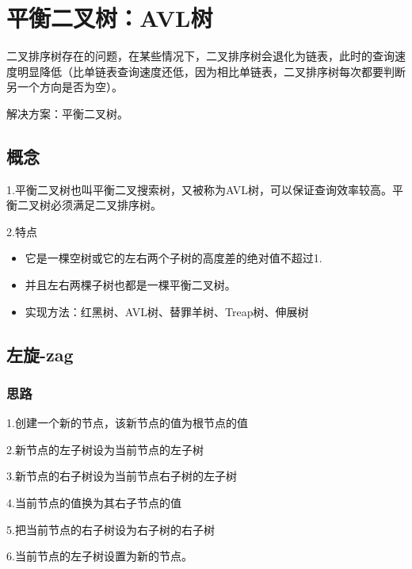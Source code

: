 \documentclass[a4paper]{report}
\begin{document}
\chapter{平衡二叉树：AVL树}
二叉排序树存在的问题，在某些情况下，二叉排序树会退化为链表，此时的查询速度明显降低（比单链表查询速度还低，因为相比单链表，二叉排序树每次都要判断另一个方向是否为空）。

解决方案：平衡二叉树。
\section{概念}
1.平衡二叉树也叫平衡二叉搜索树，又被称为AVL树，可以保证查询效率较高。平衡二叉树必须满足二叉排序树。

2.特点
\begin{itemize}
  \item 它是一棵空树或它的左右两个子树的高度差的绝对值不超过1.
  \item 并且左右两棵子树也都是一棵平衡二叉树。
  \item 实现方法：红黑树、AVL树、替罪羊树、Treap树、伸展树
\end{itemize}
\section{左旋-zag}
\subsection{思路}
1.创建一个新的节点，该新节点的值为根节点的值

2.新节点的左子树设为当前节点的左子树

3.新节点的右子树设为当前节点右子树的左子树

4.当前节点的值换为其右子节点的值

5.把当前节点的右子树设为右子树的右子树

6.当前节点的左子树设置为新的节点。
\end{document}
